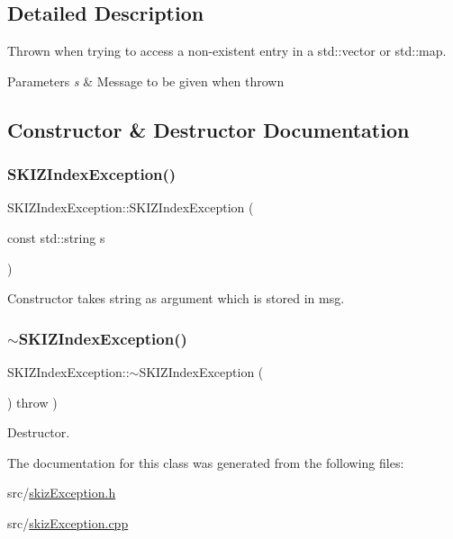 \subsection{Detailed Description}
Thrown when trying to access a non-\/existent entry in a std\+::vector or std\+::map. 


\begin{DoxyParams}{Parameters}
{\em s} & Message to be given when thrown \\
\hline
\end{DoxyParams}


\subsection{Constructor \& Destructor Documentation}
\mbox{\label{classSKIZIndexException_abd89a7895a20077dbb514271c6455f75}} 
\subsubsection{\texorpdfstring{S\+K\+I\+Z\+Index\+Exception()}{SKIZIndexException()}}
{\footnotesize\ttfamily S\+K\+I\+Z\+Index\+Exception\+::\+S\+K\+I\+Z\+Index\+Exception (\begin{DoxyParamCaption}\item[{const std\+::string}]{s }\end{DoxyParamCaption})}



Constructor takes string as argument which is stored in msg. 

\mbox{\label{classSKIZIndexException_ad41e9aa637c94d9e559f84333c6fafb5}} 
\subsubsection{\texorpdfstring{$\sim$\+S\+K\+I\+Z\+Index\+Exception()}{~SKIZIndexException()}}
{\footnotesize\ttfamily S\+K\+I\+Z\+Index\+Exception\+::$\sim$\+S\+K\+I\+Z\+Index\+Exception (\begin{DoxyParamCaption}{ }\end{DoxyParamCaption}) throw  ) \hspace{0.3cm}{\ttfamily [virtual]}}



Destructor. 



The documentation for this class was generated from the following files\+:\begin{DoxyCompactItemize}
\item 
src/\mbox{\hyperlink{skizException_8h}{skiz\+Exception.\+h}}\item 
src/\mbox{\hyperlink{skizException_8cpp}{skiz\+Exception.\+cpp}}\end{DoxyCompactItemize}
